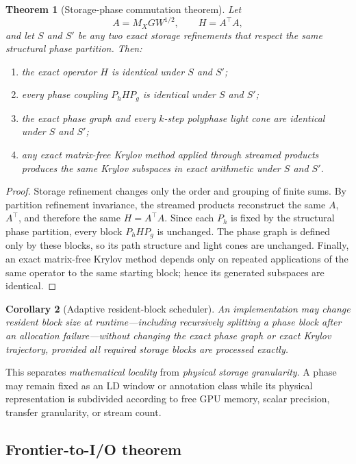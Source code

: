 \documentclass[11pt]{article}
\newtheorem{theorem}{Theorem}[section]
\newtheorem{corollary}[theorem]{Corollary}
\theoremstyle{definition}
\theoremstyle{remark}
\begin{document}
\begin{theorem}[Storage-phase commutation theorem]\label{claim:final-29-1}
Let
\[
A=M_XGW^{1/2},
\qquad H=A^\top A,
\]
and let $S$ and $S'$ be any two exact storage refinements that respect the
same structural phase partition.  Then:
\begin{enumerate}[label=(\roman*)]
\item the exact operator $H$ is identical under $S$ and $S'$;
\item every phase coupling $P_hHP_g$ is identical under $S$ and $S'$;
\item the exact phase graph and every $k$-step polyphase light cone are
identical under $S$ and $S'$;
\item any exact matrix-free Krylov method applied through streamed products
produces the same Krylov subspaces in exact arithmetic under $S$ and $S'$.
\end{enumerate}
\end{theorem}

\begin{proof}
Storage refinement changes only the order and grouping of finite sums.
By partition refinement invariance, the streamed products reconstruct the
same $A$, $A^\top$, and therefore the same $H=A^\top A$.  Since each
$P_h$ is fixed by the structural phase partition, every block
$P_hHP_g$ is unchanged.  The phase graph is defined only by these blocks, so
its path structure and light cones are unchanged.  Finally, an exact
matrix-free Krylov method depends only on repeated applications of the same
operator to the same starting block; hence its generated subspaces are
identical.
\end{proof}

\begin{corollary}[Adaptive resident-block scheduler]\label{claim:final-29-2}
An implementation may change resident block size at runtime---including
recursively splitting a phase block after an allocation failure---without
changing the exact phase graph or exact Krylov trajectory, provided all
required storage blocks are processed exactly.
\end{corollary}

This separates \emph{mathematical locality} from \emph{physical storage
granularity}.  A phase may remain fixed as an LD window or annotation class
while its physical representation is subdivided according to free GPU
memory, scalar precision, transfer granularity, or stream count.

\subsection{Frontier-to-I/O theorem}
\end{document}
